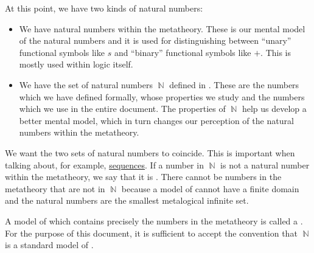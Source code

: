\begin{remark}\label{rem:standard_models_of_arithmetic}
  At this point, we have two kinds of natural numbers:
  \begin{itemize}
    \item We have natural numbers within the metatheory. These is our mental model of the natural numbers and it is used for distinguishing between \enquote{unary} functional symbols like \( s \) and \enquote{binary} functional symbols like \( + \). This is mostly used within logic itself.

    \item We have the set of natural numbers \( \BbbN \) defined in . These are the numbers which we have defined formally, whose properties we study and the numbers which we use in the entire document. The properties of \( \BbbN \) help us develop a better mental model, which in turn changes our perception of the natural numbers within the metatheory.
  \end{itemize}

  We want the two sets of natural numbers to coincide. This is important when talking about, for example, \hyperref[def:sequence]{sequences}. If a number in \( \BbbN \) is not a natural number within the metatheory, we say that it is . There cannot be numbers in the metatheory that are not in \( \BbbN \) because a model of  cannot have a finite domain and the natural numbers are the smallest metalogical infinite set.

  A model of  which contains precisely the numbers in the metatheory is called a . For the purpose of this document, it is sufficient to accept the convention that \( \BbbN \) is a standard model of .
\end{remark}

